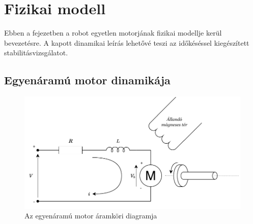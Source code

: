 \chapter{Fizikai modell}\label{chap:physical_system}

Ebben a fejezetben a robot egyetlen motorjának fizikai modellje kerül bevezetésre. A kapott dinamikai leírás
lehetővé teszi az időkéséssel kiegészített stabilitásvizsgálatot. 

\section{Egyenáramú motor dinamikája}

\begin{figure}[h]
\begin{center}
\includegraphics[width=\textwidth]{images/motor_model_electric.pdf}
\caption{Az egyenáramú motor áramköri diagramja}
\label{fig:dc_motor_electric}
\end{center}
\end{figure}

